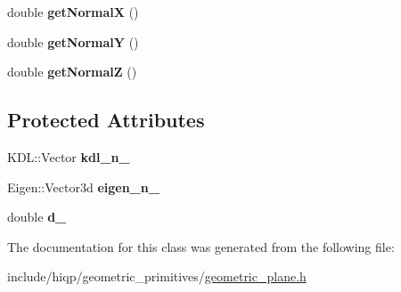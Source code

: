 \begin{DoxyCompactItemize}
\item 
\hypertarget{classhiqp_1_1GeometricPlane_a896a57f9079ad048aff909a8aa33ce80}{double {\bfseries get\-Normal\-X} ()}\label{classhiqp_1_1GeometricPlane_a896a57f9079ad048aff909a8aa33ce80}

\item 
\hypertarget{classhiqp_1_1GeometricPlane_a5e045f7ab1da8f442b810400e0a87c88}{double {\bfseries get\-Normal\-Y} ()}\label{classhiqp_1_1GeometricPlane_a5e045f7ab1da8f442b810400e0a87c88}

\item 
\hypertarget{classhiqp_1_1GeometricPlane_a451dcfbbf9ac6a644fcd20c262e71d09}{double {\bfseries get\-Normal\-Z} ()}\label{classhiqp_1_1GeometricPlane_a451dcfbbf9ac6a644fcd20c262e71d09}

\end{DoxyCompactItemize}
\subsection*{Protected Attributes}
\begin{DoxyCompactItemize}
\item 
\hypertarget{classhiqp_1_1GeometricPlane_a4ab34b3df1400a3374fad505fb98a900}{K\-D\-L\-::\-Vector {\bfseries kdl\-\_\-n\-\_\-}}\label{classhiqp_1_1GeometricPlane_a4ab34b3df1400a3374fad505fb98a900}

\item 
\hypertarget{classhiqp_1_1GeometricPlane_a20a5c7d89a7ee8f875c8e7f98e0424d0}{Eigen\-::\-Vector3d {\bfseries eigen\-\_\-n\-\_\-}}\label{classhiqp_1_1GeometricPlane_a20a5c7d89a7ee8f875c8e7f98e0424d0}

\item 
\hypertarget{classhiqp_1_1GeometricPlane_ad170d51627aaea42ecd2928af63f4d0a}{double {\bfseries d\-\_\-}}\label{classhiqp_1_1GeometricPlane_ad170d51627aaea42ecd2928af63f4d0a}

\end{DoxyCompactItemize}


The documentation for this class was generated from the following file\-:\begin{DoxyCompactItemize}
\item 
include/hiqp/geometric\-\_\-primitives/\hyperlink{geometric__plane_8h}{geometric\-\_\-plane.\-h}\end{DoxyCompactItemize}
